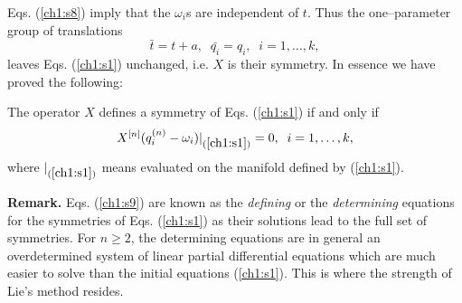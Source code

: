 Eqs. (\ref{ch1:s8})
imply that the $\omega_i$s are independent of $t$. Thus the one--parameter
group of translations
\[ \bar t=t+a,\;\; \bar{q_i}=q_i,\;\;i=1,\dots, k,\]
leaves Eqs. (\ref{ch1:s1}) unchanged, i.e. $X$ is their symmetry. In essence
we have proved the following:
\begin{theo}
\label{inv}
\begin{em}
The operator $X$ defines a symmetry of Eqs. (\ref{ch1:s1}) if and only if
\begin{equation}
\label{ch1:s9}
X^{[n]} (q_i^{(n)}-\omega_i)|_{(\ref{ch1:s1})}=0,\;\; i=1,\ldots,k,
\end{equation}
where $|_{(\ref{ch1:s1})}$ means evaluated on the manifold
defined by (\ref{ch1:s1}).
\end{em}
\end{theo}
{\bf Remark.} Eqs. (\ref{ch1:s9}) are known as the {\em defining} or the
{\em determining} equations for the symmetries of Eqs. (\ref{ch1:s1})
as their solutions
lead to the full set of symmetries. For $n \ge 2$, the determining equations
are in general an overdetermined system of linear partial differential
equations which are much easier to solve than the initial
equations (\ref{ch1:s1}). This is
where the strength of Lie's method resides.

